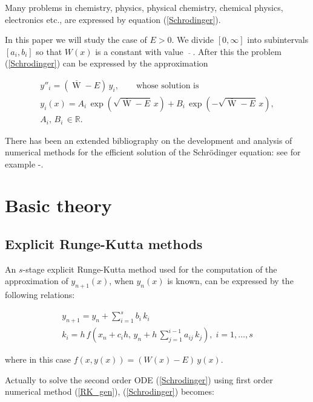\documentclass[numreferences]{kluwer}
\begin{document}
\begin{article}
Many problems in chemistry, physics, physical chemistry, chemical physics, electronics etc., are expressed by equation
(\ref{Schrodinger}).

In this paper we will study the case of $E>0$. We divide $[0,\infty]$ into subintervals $[a_{i},b_{i}]$ so that $W(x)$
is a constant with value ${\mathop{W_{i}}\limits^{\_}}$. After this the problem (\ref{Schrodinger}) can be expressed by
the approximation

\begin{equation}
\begin{array}{l}
\label{Schrodinger_simplified}
y''_{i} = ({\mathop{W}\limits^{\_}} - E)\,y_{i}, \quad\quad \mbox{whose solution is}\\
y_{i}(x) = A_{i}\,\exp{\left(\sqrt{{\mathop{W}\limits^{\_}}-E}\,x\right)} +
B_{i}\,\exp{\left(-\sqrt{{\mathop{W}\limits^{\_}}-E}\,x\right)}, \\
 A_{i},\,B_{i}\,\in {\mathbb R}.
\end{array}
\end{equation}

There has been an extended bibliography on the development and analysis of numerical methods for the efficient solution of the Schr\"odinger equation: see for example \cite{royal}-\cite{jnaiam3_11}.

\section{Basic theory}
\label{theory}
\subsection{Explicit Runge-Kutta methods}
\label{theory_rk}

An $s$-stage explicit Runge-Kutta method used for the computation of the approximation of $y_{n+1}(x)$, when $y_{n}(x)$
is known, can be expressed by the following relations:

\begin{eqnarray}
\label{RK_gen}
\nonumber   y_{n + 1} = y_{n}+{\sum\limits_{i = 1}^{s} {b_{i}}}\,k_{i}\\
            k_{i} = h\, f\left(x_{n} + c_{i} h,\,y_{n} + h\,{\sum\limits_{j = 1}^{i - 1} {a_{ij}\, k_{j}} } \right),\;
            i = 1,\ldots,s
\end{eqnarray}

\noindent where in this case $f\left(x,y(x)\right) = \left( W(x) - E \right) \, y(x)$.

Actually to solve the second order ODE (\ref{Schrodinger}) using first order numerical method (\ref{RK_gen}),
(\ref{Schrodinger}) becomes:


\end{article}
\end{document}
